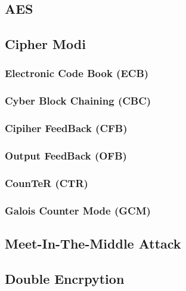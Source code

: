 \documentclass[
  10pt,
  a4paper,
  twocolumn]{article}
\begin{document}
\subsection{AES}\label{aes}

\subsection{\texorpdfstring{Cipher Modi
\href{https://en.wikipedia.org/wiki/Block_cipher_mode_of_operation\#CTR}{\faWikipediaW}}{Cipher Modi }}\label{cipher-modi}

\subsubsection{Electronic Code Book
(ECB)}\label{electronic-code-book-ecb}

\subsubsection{Cyber Block Chaining
(CBC)}\label{cyber-block-chaining-cbc}

\subsubsection{Cipiher FeedBack (CFB)}\label{cipiher-feedback-cfb}

\subsubsection{Output FeedBack (OFB)}\label{output-feedback-ofb}

\subsubsection{CounTeR (CTR)}\label{counter-ctr}

\subsubsection{Galois Counter Mode (GCM)}\label{galois-counter-mode-gcm}

\subsection{Meet-In-The-Middle Attack}\label{meet-in-the-middle-attack}

\subsection{Double Encrpytion}\label{double-encrpytion}
\end{document}
